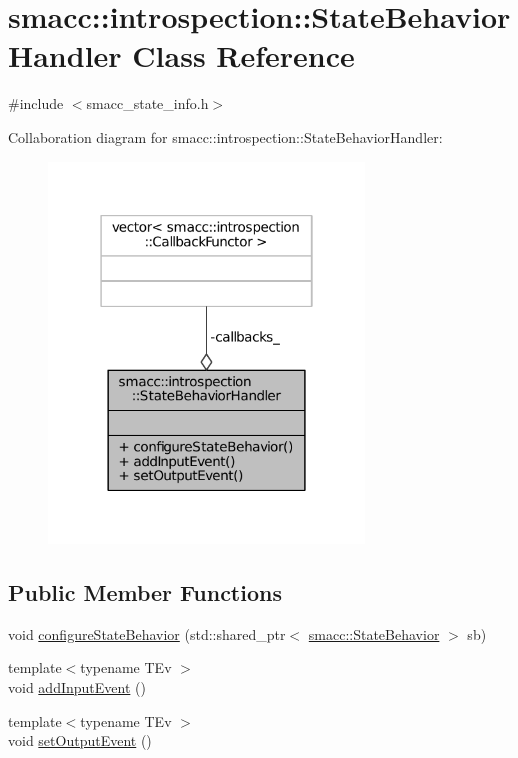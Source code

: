 \hypertarget{classsmacc_1_1introspection_1_1StateBehaviorHandler}{}\section{smacc\+:\+:introspection\+:\+:State\+Behavior\+Handler Class Reference}
\label{classsmacc_1_1introspection_1_1StateBehaviorHandler}


{\ttfamily \#include $<$smacc\+\_\+state\+\_\+info.\+h$>$}



Collaboration diagram for smacc\+:\+:introspection\+:\+:State\+Behavior\+Handler\+:
\nopagebreak
\begin{figure}[H]
\begin{center}
\leavevmode
\includegraphics[width=238pt]{classsmacc_1_1introspection_1_1StateBehaviorHandler__coll__graph}
\end{center}
\end{figure}
\subsection*{Public Member Functions}
\begin{DoxyCompactItemize}
\item 
void \hyperlink{classsmacc_1_1introspection_1_1StateBehaviorHandler_aefcd40058547a808232ebb0258a08d61}{configure\+State\+Behavior} (std\+::shared\+\_\+ptr$<$ \hyperlink{classsmacc_1_1StateBehavior}{smacc\+::\+State\+Behavior} $>$ sb)
\item 
{\footnotesize template$<$typename T\+Ev $>$ }\\void \hyperlink{classsmacc_1_1introspection_1_1StateBehaviorHandler_aa4f2ae7831cd27dfe47bd89882aceeb7}{add\+Input\+Event} ()
\item 
{\footnotesize template$<$typename T\+Ev $>$ }\\void \hyperlink{classsmacc_1_1introspection_1_1StateBehaviorHandler_a2579188153b8e819f981c9e39850704e}{set\+Output\+Event} ()
\end{DoxyCompactItemize}
